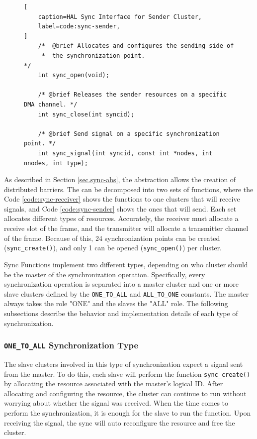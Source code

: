 \begin{figure}[t]
\begin{lstlisting}[
	caption=HAL Sync Interface for Sender Cluster,
	label=code:sync-sender,
]
	/*  @brief Allocates and configures the sending side of
	 *  the synchronization point.                          */
	int sync_open(void);

	/* @brief Releases the sender resources on a specific DMA channel. */
	int sync_close(int syncid);

	/* @brief Send signal on a specific synchronization point. */
	int sync_signal(int syncid, const int *nodes, int nnodes, int type);
\end{lstlisting}
\end{figure}

		As described in Section \ref{sec.sync-abs}, the \sync abstraction allows the
		creation of distributed barriers.
		The \sync can be decomposed into two sets of functions, where the
		Code \ref{code:sync-receiver} shows the functions to one clusters
		that will receive signals, and Code \ref{code:sync-sender} shows the
		ones that will send.
		Each set allocates different types of resources.
		Accurately, the receiver must allocate a receive slot of the frame,
		and the transmitter will allocate a transmitter channel of the frame.
		Because of this, 24 synchronization points can be created (\texttt{sync\_create()}),
		and only 1 can be opened (\texttt{sync\_open()}) per cluster.

		Sync Functions implement two different types, depending on who cluster
		should be the master of the synchronization operation.
		Specifically, every synchronization operation is separated into a
		master cluster and one or more slave clusters defined by the
		\texttt{ONE\_TO\_ALL} and \texttt{ALL\_TO\_ONE} constants.
		The master always takes the role "ONE" and the slaves the "ALL" role.
		The following subsections describe the behavior and implementation
		details of each type of synchronization.

			\subsubsection*{\texttt{ONE\_TO\_ALL} Synchronization Type}

				The slave clusters involved in this type of synchronization expect
				a signal sent from the master.
				To do this, each slave will perform the function \texttt{sync\_create()}
				by allocating the resource associated with the master's logical ID.
				After allocating and configuring the resource, the cluster can
				continue to run without worrying about whether the signal was received.
				When the time comes to perform the synchronization, it is enough for
				the slave to run the function.
				Upon receiving the signal, the sync will auto reconfigure the resource
				and free the cluster.

